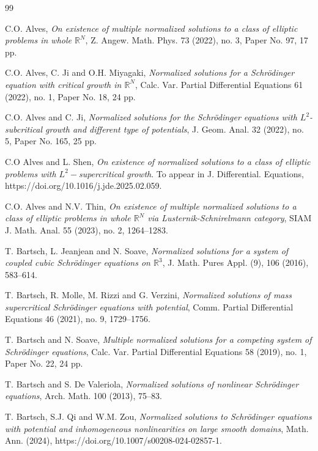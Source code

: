 \documentclass[11pt]{amsart}
\numberwithin{equation}{section}
\begin{document}
  \begin{thebibliography}{99}

 C.O. Alves, {\it On existence of multiple normalized solutions to a class of elliptic problems in whole $\mathbb R^N$},
Z. Angew. Math. Phys. 73 (2022), no. 3, Paper No. 97, 17 pp.

 C.O. Alves,  C. Ji and O.H. Miyagaki, {\it Normalized solutions for a Schr\"{o}dinger equation with critical growth in $\mathbb{R}^{N}$}, Calc. Var. Partial Differential Equations 61 (2022), no. 1, Paper No. 18, 24 pp.

 C.O. Alves and C. Ji, {\it Normalized solutions for the Schr\"odinger equations with $L^2$-subcritical growth and different type of potentials},
J. Geom. Anal. 32 (2022), no. 5, Paper No. 165, 25 pp.

 C.O Alves and L. Shen, {\it On existence of normalized solutions to a class of elliptic problems with $L^2-$supercritical growth}. To appear in J. Differential. Equations, https://doi.org/10.1016/j.jde.2025.02.059.

 C.O. Alves and N.V. Thin, {\it On existence of multiple normalized solutions to a class of elliptic problems in whole $\mathbb{R}^N$ via Lusternik-Schnirelmann category},
SIAM J. Math. Anal. 55 (2023), no. 2, 1264--1283.

 T. Bartsch, L. Jeanjean and N. Soave, {\it Normalized solutions for a system of coupled cubic Schr\"odinger equations on $\mathbb{R}^3$}, J. Math. Pures Appl. (9), 106 (2016), 583--614.

  T. Bartsch, R. Molle, M. Rizzi and G. Verzini, {\it Normalized solutions of mass supercritical Schr\"odinger  equations with potential},  Comm. Partial Differential Equations 46 (2021), no. 9, 1729--1756.

 T. Bartsch and N. Soave, {\it Multiple normalized solutions for a competing system of Schr\"odinger equations},
Calc. Var. Partial Differential Equations 58 (2019), no. 1, Paper No. 22, 24 pp.

 T. Bartsch and S. De Valeriola, {\it Normalized solutions of nonlinear Schr\"odinger equations},  Arch.
Math. 100 (2013), 75--83.

 T. Bartsch, S.J. Qi and W.M. Zou, {\it Normalized solutions to Schr\"{o}dinger equations with potential and inhomogeneous nonlinearities on large smooth domains}, Math. Ann. (2024), https://doi.org/10.1007/s00208-024-02857-1.




\end{thebibliography}
\end{document}
